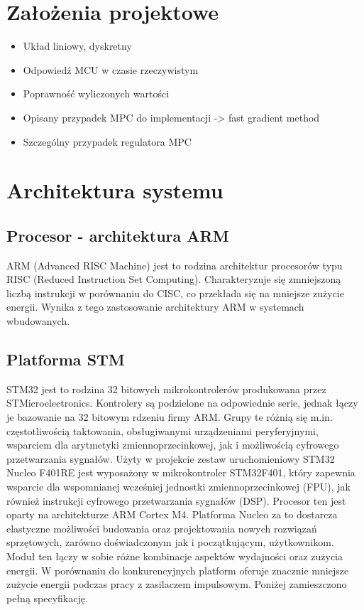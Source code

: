 \section{Założenia projektowe} \label{sec:assumptions}
\begin{itemize}
	\item Układ liniowy, dyskretny
	\item Odpowiedź MCU w czasie rzeczywistym
    \item Poprawność wyliczonych wartości
    \item Opisany przypadek MPC do implementacji -> fast gradient method
    \item Szczególny przypadek regulatora MPC
\end{itemize}

\section{Architektura systemu} \label{sec:system}

\subsection{Procesor - architektura ARM} \label{sec:arm}
ARM (Advanced RISC Machine) jest to rodzina architektur procesorów typu RISC (Reduced Instruction
Set Computing). Charakteryzuje się zmniejszoną liczbą instrukcji w porównaniu do CISC, co
przekłada się na mniejsze zużycie energii. Wynika z tego zastosowanie architektury ARM
w systemach wbudowanych. %

\subsection{Platforma STM} \label{sec:stm}
STM32 jest to rodzina 32 bitowych mikrokontrolerów produkowana przez STMicroelectronics.
Kontrolery są podzielone na odpowiednie serie, jednak łączy je bazowanie na 32 bitowym
rdzeniu firmy ARM. Grupy te różnią się m.in. częstotliwością taktowania, obsługiwanymi
urządzeniami peryferyjnymi, wsparciem dla arytmetyki zmiennoprzecinkowej, jak i możliwością
cyfrowego przetwarzania sygnałów.
Użyty w projekcie zestaw uruchomieniowy STM32 Nucleo F401RE jest wyposażony w mikrokontroler
STM32F401, który zapewnia wsparcie dla wspomnianej wcześniej jednostki zmiennoprzecinkowej (FPU),
jak również instrukcji cyfrowego przetwarzania sygnałów (DSP). Procesor ten jest oparty na
architekturze ARM Cortex M4. Platforma Nucleo za to dostarcza elastyczne
możliwości budowania oraz projektowania nowych rozwiązań sprzętowych, zarówno
doświadczonym jak i początkującym, użytkownikom. Moduł ten łączy w sobie różne kombinacje
aspektów wydajności oraz zużycia energii. W porównaniu do konkurencyjnych platform oferuje
znacznie mniejsze zużycie energii podczas pracy z zasilaczem impulsowym.
Poniżej zamieszczono pełną specyfikację.

